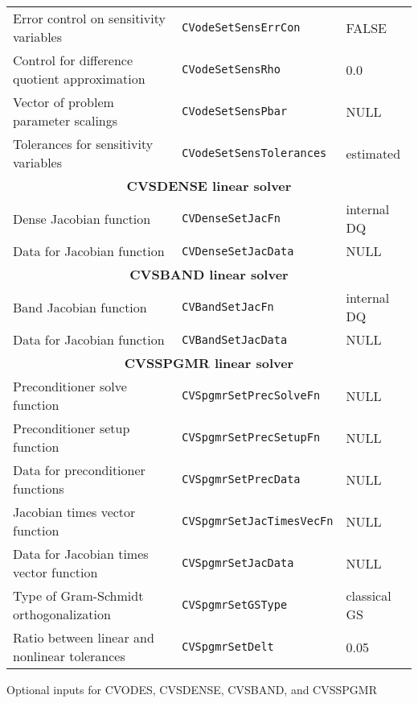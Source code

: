 \begin{acmtable}{\textwidth}
\begin{tabularx}{\textwidth}{lll}
Error control on sensitivity variables & {\tt CVodeSetSensErrCon} & FALSE \\
Control for difference quotient approximation & {\tt CVodeSetSensRho}   & 0.0 \\
Vector of problem parameter scalings & {\tt CVodeSetSensPbar}  & NULL \\
Tolerances for sensitivity variables & {\tt CVodeSetSensTolerances} & estimated \\
\hline
\multicolumn{3}{c}{\bf CVSDENSE linear solver} \\
\hline
Dense Jacobian function & {\tt CVDenseSetJacFn} & internal DQ \\
Data for Jacobian function & {\tt CVDenseSetJacData} & NULL \\
\hline
\multicolumn{3}{c}{\bf CVSBAND linear solver} \\
\hline
Band Jacobian function & {\tt CVBandSetJacFn} & internal DQ \\
Data for Jacobian function & {\tt CVBandSetJacData} & NULL \\
\hline
\multicolumn{3}{c}{\bf CVSSPGMR linear solver} \\
\hline
Preconditioner solve function & {\tt CVSpgmrSetPrecSolveFn} & NULL \\
Preconditioner setup function & {\tt CVSpgmrSetPrecSetupFn} & NULL \\
Data for preconditioner functions & {\tt CVSpgmrSetPrecData} & NULL \\
Jacobian times vector function & {\tt CVSpgmrSetJacTimesVecFn} & NULL \\
Data for Jacobian times vector function &{\tt CVSpgmrSetJacData} & NULL \\
Type of Gram-Schmidt orthogonalization & {\tt CVSpgmrSetGSType} & classical GS \\
Ratio between linear and nonlinear tolerances & {\tt CVSpgmrSetDelt} & 0.05 \\
\end{tabularx}
\caption{Optional inputs for CVODES, CVSDENSE, CVSBAND, and CVSSPGMR}
\label{t:optional_inputs}
\end{acmtable}
%
%
